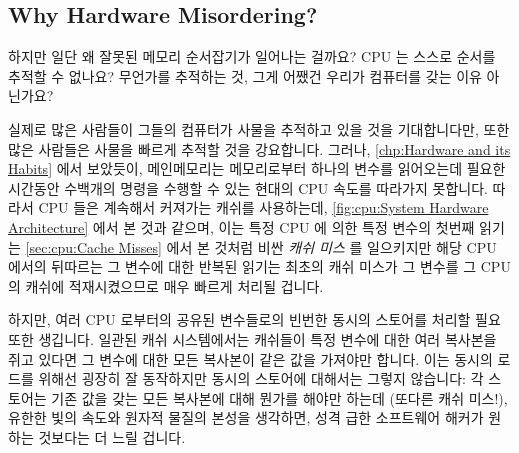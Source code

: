 \fi

\subsection{Why Hardware Misordering?}
\label{sec:memorder:Why Hardware Misordering?}

하지만 일단 왜 잘못된 메모리 순서잡기가 일어나는 걸까요?
CPU 는 스스로 순서를 추적할 수 없나요?
무언가를 추적하는 것, 그게 어쨌건 우리가 컴퓨터를 갖는 이유 아닌가요?

실제로 많은 사람들이 그들의 컴퓨터가 사물을 추적하고 있을 것을 기대합니다만,
또한 많은 사람들은 사물을 빠르게 추적할 것을 강요합니다.
그러나, \cref{chp:Hardware and its Habits} 에서 보았듯이, 메인메모리는
메모리로부터 하나의 변수를 읽어오는데 필요한 시간동안 수백개의 명령을 수행할 수
있는 현대의 CPU 속도를 따라가지 못합니다.
따라서 CPU 들은 계속해서 커져가는 캐쉬를 사용하는데,
\cref{fig:cpu:System Hardware Architecture} 에서 본 것과 같으며, 이는 특정 CPU
에 의한 특정 변수의 첫번째 읽기는
\cref{sec:cpu:Cache Misses} 에서 본 것처럼 비싼 \emph{캐쉬 미스} 를 일으키지만
해당 CPU 에서의 뒤따르는 그 변수에 대한 반복된 읽기는 최초의 캐쉬 미스가 그
변수를 그 CPU 의 캐쉬에 적재시켰으므로 매우 빠르게 처리될 겁니다.

하지만, 여러 CPU 로부터의 공유된 변수들로의 빈번한 동시의 스토어를 처리할 필요
또한 생깁니다.
일관된 캐쉬 시스템에서는 캐쉬들이 특정 변수에 대한 여러 복사본을 쥐고 있다면 그
변수에 대한 모든 복사본이 같은 값을 가져야만 합니다.
이는 동시의 로드를 위해선 굉장히 잘 동작하지만 동시의 스토어에 대해서는 그렇지
않습니다: 각 스토어는 기존 값을 갖는 모든 복사본에 대해 뭔가를 해야만 하는데
(또다른 캐쉬 미스!), 유한한 빛의 속도와 원자적 물질의 본성을 생각하면, 성격
급한 소프트웨어 해커가 원하는 것보다는 더 느릴 겁니다.


